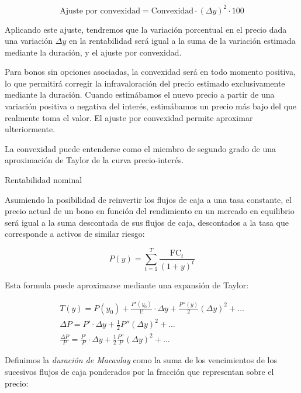 \documentclass{nuevotema}
\begin{document}
\begin{equation}
\text{Ajuste por convexidad}= \text{Convexidad} \cdot (\varDelta y)^2 \cdot 100
\end{equation}

Aplicando este ajuste, tendremos que la variación porcentual en el precio dada una variación $\varDelta y$ en la rentabilidad será igual a la suma de la variación estimada mediante la duración, y el ajuste por convexidad.

Para bonos sin opciones asociadas, la convexidad será en todo momento positiva, lo que permitirá corregir la infravaloración del precio estimado exclusivamente mediante la duración. Cuando estimábamos el nuevo precio a partir de una variación positiva o negativa del interés, estimábamos un precio más bajo del que realmente toma el valor. El ajuste por convexidad permite aproximar ulteriormente.

La convexidad puede entenderse como el miembro de segundo grado de una aproximación de Taylor de la curva precio-interés.

Rentabilidad nominal

Asumiendo la posibilidad de reinvertir los flujos de caja a una tasa constante, el precio actual de un bono en función del rendimiento en un mercado en equilibrio será igual a la suma descontada de sus flujos de caja, descontados a la tasa que corresponde a activos de similar riesgo:

\begin{equation}
P(y) = \sum_{t=1}^T \frac{\text{FC}_t}{(1+y)^t}
\end{equation}

Esta formula puede aproximarse mediante una expansión de Taylor:

\begin{align}
T(y) = P(y_0) +  \frac{P'(y_0)}{1!} \cdot \Delta y + \frac{P''(y)}{2} (\Delta y)^2  + \ldots \\
\Delta P = P' \cdot \Delta y + \frac{1}{2} P'' (\Delta y)^2  + \ldots \\
\frac{\Delta P}{P} = \frac{P'}{P} \cdot \Delta y + \frac{1}{2} \frac{P''}{P} (\Delta y)^2 + \ldots
\end{align}

Definimos la \textit{duración de Macaulay} como la suma de los vencimientos de los sucesivos flujos de caja ponderados por la fracción que representan sobre el precio:
\end{document}
